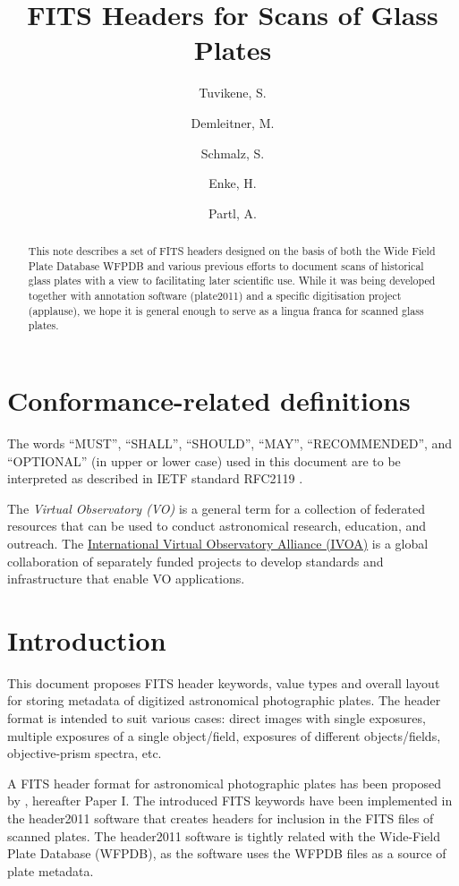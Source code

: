 \documentclass[11pt]{ivoa}
\title{FITS Headers for Scans of Glass Plates}
\author{Tuvikene, S.}
\author{Demleitner, M.}
\author{Schmalz, S.}
\author{Enke, H.}
\author{Partl, A.}
\begin{document}
\begin{abstract}
This note describes a set of FITS headers designed on the basis of both
the Wide Field Plate Database WFPDB and various previous efforts to
document scans of historical glass plates with a view to facilitating
later scientific use.  While it was being developed together with
annotation software (plate2011) and a specific digitisation project
(applause), we hope it is general enough to serve as a lingua franca for
scanned glass plates.

\end{abstract}


\section*{Conformance-related definitions}

The words ``MUST'', ``SHALL'', ``SHOULD'', ``MAY'', ``RECOMMENDED'', and
``OPTIONAL'' (in upper or lower case) used in this document are to be
interpreted as described in IETF standard RFC2119 \citep{std:RFC2119}.

The \emph{Virtual Observatory (VO)} is a
general term for a collection of federated resources that can be used
to conduct astronomical research, education, and outreach.
The \href{https://www.ivoa.net}{International
Virtual Observatory Alliance (IVOA)} is a global
collaboration of separately funded projects to develop standards and
infrastructure that enable VO applications.


\section{Introduction}

This document  proposes FITS header keywords, value types and overall
layout for storing metadata of digitized astronomical photographic
plates. The header format is intended to suit various cases: direct
images with single exposures, multiple exposures of a single
object/field, exposures of different objects/fields, objective-prism
spectra, etc.

A FITS header format for astronomical photographic plates has been
proposed by \citet{2012PASRB..11..147K},
hereafter Paper I. The introduced FITS keywords have been implemented in
the header2011 software \citep{soft:header2011} that creates headers
for inclusion in the FITS files of scanned plates. The header2011
software is tightly related with the Wide-Field Plate Database (WFPDB),
as the software uses the WFPDB files as a source of
plate metadata.
\end{document}
